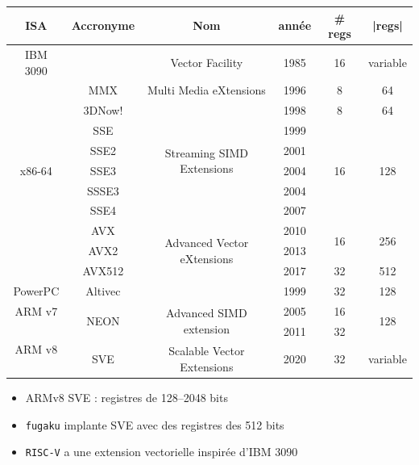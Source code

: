 \documentclass[xcolor={x11names,svgnames}]{beamer}
\begin{document}

\begin{frame}
  \scriptsize
  \begin{tabular}{|c||c|c|c|c|c|}
  \hline
  ISA & Accronyme & Nom & année & \# regs & |regs| \\
  \hline  \hline
    IBM 3090 & & Vector Facility & 1985 & 16 & variable \\ 
    \hline  \hline
  \multirow{9}{*}{x86-64} & MMX & Multi Media eXtensions & 1996 & 8 & 64 \\
  \cline{2-6}
  & 3DNow! &                                            & 1998 & 8  &  64 \\
    \cline{2-6}
  & SSE    & \multirow{4}{*}{Streaming SIMD Extensions} & 1999 & \multirow{5}{*}{16} & \multirow{5}{*}{128} \\
  & SSE2   &                           & 2001 &         & \\
  & SSE3   &                           & 2004 &         & \\
  & SSSE3  &                           & 2004 &         & \\
  & SSE4   &                           & 2007 &         & \\
    \cline{2-6}
  & AVX    & \multirow{3}{*}{Advanced Vector eXtensions} & 2010 & \multirow{2}{*}{16} & \multirow{2}{*}{256} \\
  & AVX2   &                           & 2013  &    &     \\
    \cline{2-2}\cline{4-6}
  & AVX512 &                           & 2017  & 32 & 512 \\
  \hline\hline
  PowerPC & Altivec & & 1999 & 32 & 128 \\
  \hline\hline
  ARM v7 & \multirow{2}{*}{NEON} & \multirow{2}{*}{Advanced SIMD extension}    & 2005 & 16 & \multirow{2}{*}{128} \\
  \cline{1-1}%
  \multirow{2}{*}{ARM v8} &      &                            & 2011 & 32 &  \\
  \cline{2-6}
   & SVE  & Scalable Vector Extensions & 2020 & 32 & variable \\
  \hline
\end{tabular}  

\bigskip

\normalsize
\begin{itemize}
\item ARMv8 SVE : registres de 128--2048 bits
\item \texttt{fugaku} implante SVE avec des registres des 512 bits
\item \texttt{RISC-V} a une extension vectorielle inspirée d'IBM 3090
\end{itemize}
\end{frame}
\end{document}
